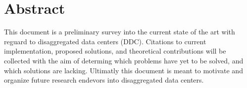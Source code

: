 \section{Abstract}
\label{sec:abstract}

This document is a preliminary survey into the current state of the art with
reguard to disaggregated data centers (DDC). Citations to current
implementation, proposed solutions, and theoretical contributions will be
collected with the aim of determing which problems have yet to be solved, and
which solutions are lacking. Ultimatly this document is meant to motivate and organize future research endevors into disaggregated data centers.


